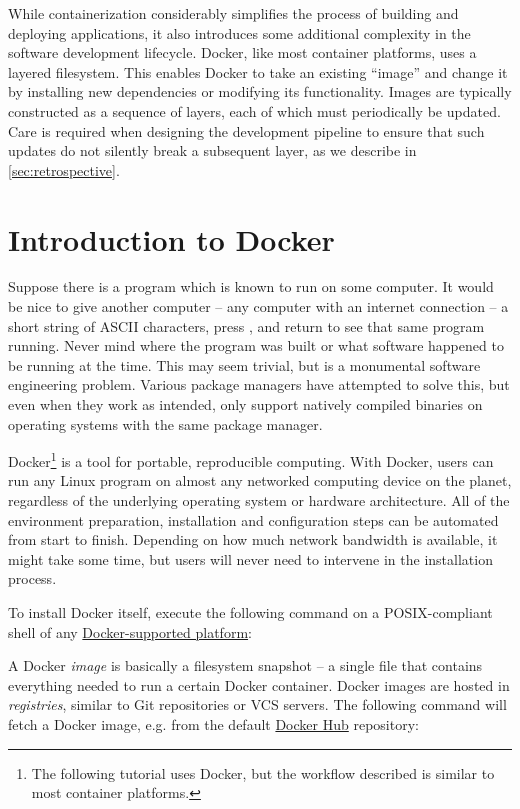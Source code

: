 While containerization considerably simplifies the process of building and deploying applications, it also introduces some additional complexity in the software development lifecycle. Docker, like most container platforms, uses a layered filesystem. This enables Docker to take an existing ``image'' and change it by installing new dependencies or modifying its functionality. Images are typically constructed as a sequence of layers, each of which must periodically be updated. Care is required when designing the development pipeline to ensure that such updates do not silently break a subsequent layer, as we describe in \autoref{sec:retrospective}.

\section{Introduction to Docker}\label{sec:docker-intro}

Suppose there is a program which is known to run on some computer. It would be nice to give another computer -- any computer with an internet connection -- a short string of ASCII characters, press \keys{\return}, and return to see that same program running. Never mind where the program was built or what software happened to be running at the time. This may seem trivial, but is a monumental software engineering problem. Various package managers have attempted to solve this, but even when they work as intended, only support natively compiled binaries on operating systems with the same package manager.

Docker\footnote{The following tutorial uses Docker, but the workflow described is similar to most container platforms.} is a tool for portable, reproducible computing. With Docker, users can run any Linux program on almost any networked computing device on the planet, regardless of the underlying operating system or hardware architecture. All of the environment preparation, installation and configuration steps can be automated from start to finish. Depending on how much network bandwidth is available, it might take some time, but users will never need to intervene in the installation process.

To install Docker itself, execute the following command on a POSIX-compliant shell of any \href{https://docs.docker.com/install/#supported-platforms}{Docker-supported platform}:

%
A Docker \textit{image} is basically a filesystem snapshot -- a single file that contains everything needed to run a certain Docker container. Docker images are hosted in \textit{registries}, similar to Git repositories or VCS servers. The following command will fetch a Docker image, e.g.  from the default \hyperref[subsec:docker_hub]{Docker Hub} repository:


